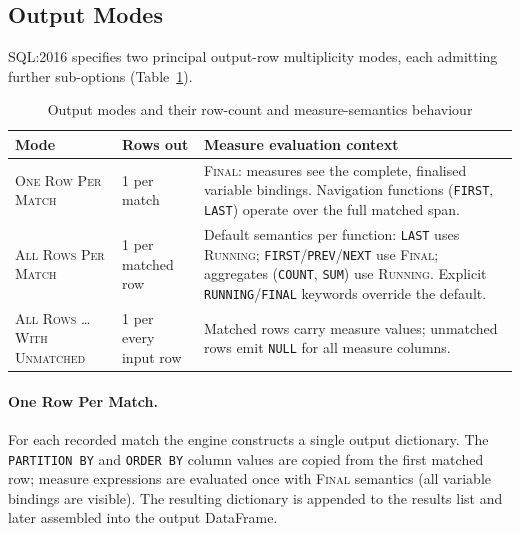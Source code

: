 \subsection{Output Modes}
\label{subsec:meth-exec-output}

SQL:2016 specifies two principal output-row multiplicity modes,
each admitting further sub-options
(Table~\ref{tab:rows-per-match}).

\begin{table}[htbp]
  \centering
  \caption{Output modes and their row-count and measure-semantics
    behaviour}
  \label{tab:rows-per-match}
  \begin{tabular}{llp{7cm}}
    \toprule
    \textbf{Mode} & \textbf{Rows out} & \textbf{Measure evaluation context} \\
    \midrule
    \textsc{One Row Per Match}
      & 1 per match
      & \textsc{Final}: measures see the complete, finalised
        variable bindings.  Navigation functions
        (\texttt{FIRST}, \texttt{LAST}) operate over the full
        matched span. \\[6pt]
    \textsc{All Rows Per Match}
      & 1 per matched row
      & Default semantics per function: \texttt{LAST} uses
        \textsc{Running}; \texttt{FIRST}/\texttt{PREV}/\texttt{NEXT}
        use \textsc{Final}; aggregates
        (\texttt{COUNT}, \texttt{SUM}) use \textsc{Running}.
        Explicit \texttt{RUNNING}/\texttt{FINAL} keywords override
        the default. \\[6pt]
    \textsc{All Rows \ldots With Unmatched}
      & 1 per every input row
      & Matched rows carry measure values; unmatched rows emit
        \texttt{NULL} for all measure columns. \\
    \bottomrule
  \end{tabular}
\end{table}

\paragraph{One Row Per Match.}
For each recorded match the engine constructs a single output
dictionary.  The \texttt{PARTITION BY} and \texttt{ORDER BY}
column values are copied from the first matched row; measure
expressions are evaluated once with \textsc{Final} semantics
(all variable bindings are visible).  The resulting dictionary is
appended to the results list and later assembled into the output
DataFrame.

